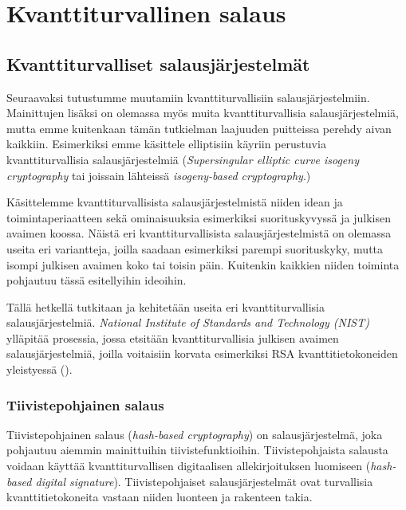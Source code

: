 \chapter{Kvanttiturvallinen salaus\label{results}}

\section{Kvanttiturvalliset salausjärjestelmät}

Seuraavaksi tutustumme muutamiin kvanttiturvallisiin salausjärjestelmiin. Mainittujen lisäksi on olemassa myös muita kvanttiturvallisia salausjärjestelmiä, mutta emme kuitenkaan tämän tutkielman laajuuden puitteissa perehdy aivan kaikkiin. Esimerkiksi emme käsittele elliptisiin käyriin perustuvia kvanttiturvallisia salausjärjestelmiä (\emph{Supersingular elliptic curve isogeny cryptography} tai joissain lähteissä \emph{isogeny-based cryptography}.)


Käsittelemme kvanttiturvallisista salausjärjestelmistä niiden idean ja toimintaperiaatteen sekä ominaisuuksia esimerkiksi suorituskyvyssä ja julkisen avaimen koossa. Näistä eri kvanttiturvallisista salausjärjestelmistä on olemassa useita eri variantteja, joilla saadaan esimerkiksi parempi suorituskyky, mutta isompi julkisen avaimen koko tai toisin päin. Kuitenkin kaikkien niiden toiminta pohjautuu tässä esitellyihin ideoihin.

Tällä hetkellä tutkitaan ja kehitetään useita eri kvanttiturvallisia salausjärjestelmiä. \emph{National Institute of Standards and Technology (NIST)} ylläpitää prosessia, jossa etsitään kvanttiturvallisia julkisen avaimen salausjärjestelmiä, joilla voitaisiin korvata esimerkiksi RSA kvanttitietokoneiden yleistyessä (\cite{alagic2020status}).

\subsection{Tiivistepohjainen salaus}
Tiivistepohjainen salaus (\emph{hash-based cryptography}) on salausjärjestelmä, joka pohjautuu aiemmin mainittuihin tiivistefunktioihin. Tiivistepohjaista salausta voidaan käyttää kvanttiturvallisen digitaalisen allekirjoituksen luomiseen (\emph{hash-based digital signature}). Tiivistepohjaiset salausjärjestelmät ovat turvallisia kvanttitietokoneita vastaan niiden luonteen ja rakenteen takia. 

